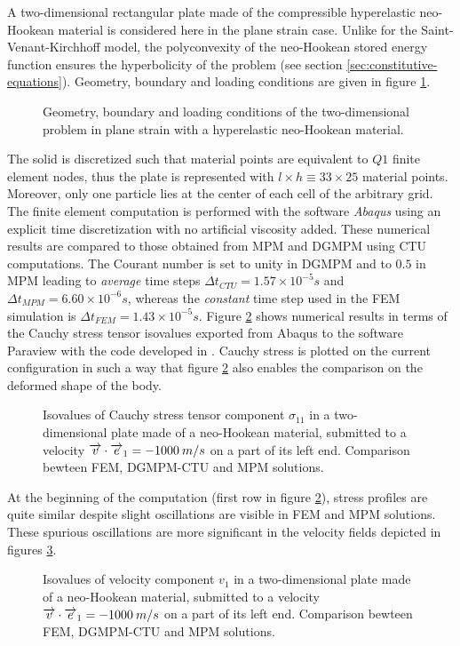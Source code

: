 A two-dimensional rectangular plate made of the compressible hyperelastic neo-Hookean material is considered here in the plane strain case. Unlike for the Saint-Venant-Kirchhoff model, the polyconvexity of the neo-Hookean stored energy function ensures the hyperbolicity of the problem (see section \ref{sec:constitutive-equations}).
Geometry, boundary and loading conditions are given in figure \ref{fig:2d_heDomain}.
\begin{figure}[h!]
  \centering
  
  \caption{Geometry, boundary and loading conditions of the two-dimensional problem in plane strain with a hyperelastic neo-Hookean material.}
  \label{fig:2d_heDomain}
\end{figure}

The solid is discretized such that material points are equivalent to $Q1$ finite element nodes, thus the plate is represented with $l \times h \equiv 33 \times 25$ material points. Moreover, only one particle lies at the center of each cell of the arbitrary grid. The finite element computation is performed with the software \textit{Abaqus} \cite{Abaqus} using an explicit time discretization with no artificial viscosity added. These numerical results are compared to those obtained from MPM and DGMPM using CTU computations. The Courant number is set to unity in DGMPM and to $0.5$ in MPM leading to \textit{average} time steps $\Delta t_{CTU}=1.57 \times 10^{-5}s$ and $\Delta t_{MPM}=6.60 \times 10^{-6}s$, whereas the \textit{constant} time step used in the FEM simulation is $\Delta t_ {FEM}=1.43 \times 10^{-5} s$. Figure \ref{fig:2dhe_stress} shows numerical results in terms of the Cauchy stress tensor isovalues exported from Abaqus to the software Paraview \cite{Paraview} with the code developed in \cite{Export_Abaqus}. Cauchy stress is plotted on the current configuration in such a way that figure \ref{fig:2dhe_stress} also enables the comparison on the deformed shape of the body.
\begin{figure}[h!]
  \centering
  
  \caption{Isovalues of Cauchy stress tensor component $\sigma_{11}$ in a two-dimensional plate made of a neo-Hookean material, submitted to a velocity ${\overrightarrow{v}}\cdot{\overrightarrow{e}}_1=-1000 \: m/s$ on a part of its left end. Comparison bewteen FEM, DGMPM-CTU and MPM solutions.}
  \label{fig:2dhe_stress}
\end{figure}
At the beginning of the computation (first row in figure \ref{fig:2dhe_stress}), stress profiles are quite similar despite slight oscillations are visible in FEM and MPM solutions. These spurious oscillations are more significant in the velocity fields depicted in figures \ref{fig:2dhe_velo}.
\begin{figure}[h!]
  \centering
  
  \caption{Isovalues of velocity component $v_1$ in a two-dimensional plate made of a neo-Hookean material, submitted to a velocity ${\overrightarrow{v}}\cdot{\overrightarrow{e}}_1=-1000 \: m/s$ on a part of its left end. Comparison bewteen FEM, DGMPM-CTU and MPM solutions.}
  \label{fig:2dhe_velo}
\end{figure}

